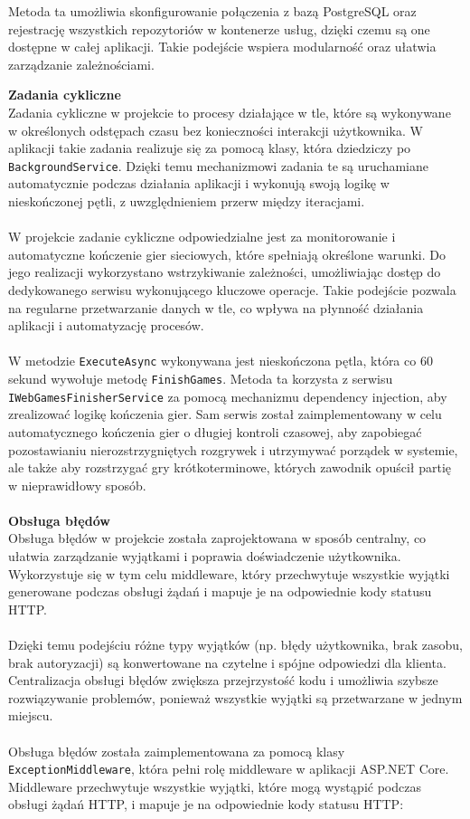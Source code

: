 \documentclass[12pt,a4paper]{article}
\begin{document}
\noindent
Metoda ta umożliwia skonfigurowanie połączenia z bazą PostgreSQL oraz rejestrację wszystkich repozytoriów w kontenerze usług, dzięki czemu są one dostępne w całej aplikacji. Takie podejście wspiera modularność oraz ułatwia zarządzanie zależnościami.

\newpage

\noindent \textbf{Zadania cykliczne}\\
Zadania cykliczne w projekcie to procesy działające w tle, które są wykonywane w określonych odstępach czasu bez konieczności interakcji użytkownika. W aplikacji takie zadania realizuje się za pomocą klasy, która dziedziczy po \texttt{BackgroundService}. Dzięki temu mechanizmowi zadania te są uruchamiane automatycznie podczas działania aplikacji i wykonują swoją logikę w nieskończonej pętli, z uwzględnieniem przerw między iteracjami.
\\\\
W projekcie zadanie cykliczne odpowiedzialne jest za monitorowanie i automatyczne kończenie gier sieciowych, które spełniają określone warunki. Do jego realizacji wykorzystano wstrzykiwanie zależności, umożliwiając dostęp do dedykowanego serwisu wykonującego kluczowe operacje. Takie podejście pozwala na regularne przetwarzanie danych w tle, co wpływa na płynność działania aplikacji i automatyzację procesów.
\\\\
W metodzie \texttt{ExecuteAsync} wykonywana jest nieskończona pętla, która co 60 sekund wywołuje metodę \texttt{FinishGames}. Metoda ta korzysta z serwisu \texttt{IWebGamesFinisherService} za pomocą mechanizmu dependency injection, aby zrealizować logikę kończenia gier. Sam serwis został zaimplementowany w celu automatycznego kończenia gier o długiej kontroli czasowej, aby zapobiegać pozostawianiu nierozstrzygniętych rozgrywek i utrzymywać porządek w systemie, ale także aby rozstrzygać gry krótkoterminowe, których zawodnik opuścił partię w nieprawidłowy sposób.
\\\\

\noindent \textbf{Obsługa błędów}\\
Obsługa błędów w projekcie została zaprojektowana w sposób centralny, co ułatwia zarządzanie wyjątkami i poprawia doświadczenie użytkownika. Wykorzystuje się w tym celu middleware, który przechwytuje wszystkie wyjątki generowane podczas obsługi żądań i mapuje je na odpowiednie kody statusu HTTP.
\\\\
Dzięki temu podejściu różne typy wyjątków (np. błędy użytkownika, brak zasobu, brak autoryzacji) są konwertowane na czytelne i spójne odpowiedzi dla klienta. Centralizacja obsługi błędów zwiększa przejrzystość kodu i umożliwia szybsze rozwiązywanie problemów, ponieważ wszystkie wyjątki są przetwarzane w jednym miejscu.
\\\\
Obsługa błędów została zaimplementowana za pomocą klasy \texttt{ExceptionMiddleware}, która pełni rolę middleware w aplikacji ASP.NET Core. Middleware przechwytuje wszystkie wyjątki, które mogą wystąpić podczas obsługi żądań HTTP, i mapuje je na odpowiednie kody statusu HTTP:
\end{document}

